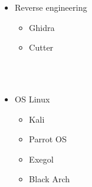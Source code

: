 \documentclass{beamer}
\begin{document}
\begin{frame}
\begin{multicols}{2}
\begin{itemize}
    \item Reverse engineering
    \begin{itemize}
        \item Ghidra
        \item Cutter
    \end{itemize}
    \\~\\
    \item OS Linux
    \begin{itemize}
        \item Kali
        \item Parrot OS
        \item Exegol
        \item Black Arch
    \end{itemize}

\end{itemize}
\end{multicols}

\end{frame}
\end{document}
